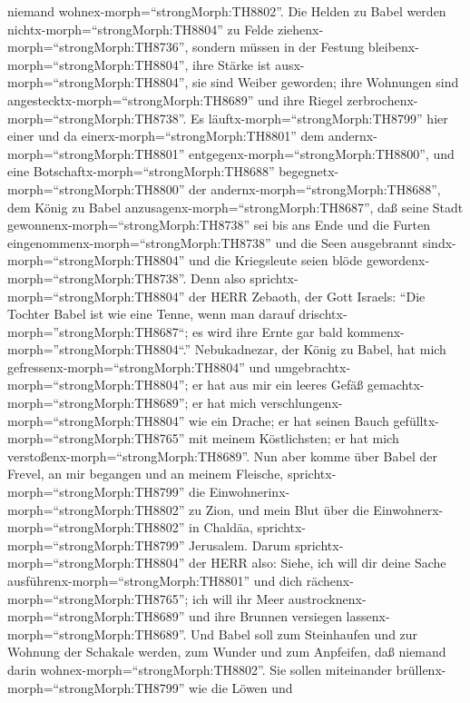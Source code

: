niemand wohnex-morph=``strongMorph:TH8802''.  Die Helden zu
Babel werden nichtx-morph=``strongMorph:TH8804'' zu Felde
ziehenx-morph=``strongMorph:TH8736'', sondern müssen in der Festung
bleibenx-morph=``strongMorph:TH8804'', ihre Stärke ist
ausx-morph=``strongMorph:TH8804'', sie sind Weiber geworden; ihre
Wohnungen sind angestecktx-morph=``strongMorph:TH8689'' und ihre Riegel
zerbrochenx-morph=``strongMorph:TH8738''.  Es
läuftx-morph=``strongMorph:TH8799'' hier einer und da
einerx-morph=``strongMorph:TH8801'' dem
andernx-morph=``strongMorph:TH8801''
entgegenx-morph=``strongMorph:TH8800'', und eine
Botschaftx-morph=``strongMorph:TH8688''
begegnetx-morph=``strongMorph:TH8800'' der
andernx-morph=``strongMorph:TH8688'', dem König zu Babel
anzusagenx-morph=``strongMorph:TH8687'', daß seine Stadt
gewonnenx-morph=``strongMorph:TH8738'' sei bis ans Ende 
und die Furten eingenommenx-morph=``strongMorph:TH8738'' und die Seen
ausgebrannt sindx-morph=``strongMorph:TH8804'' und die Kriegsleute seien
blöde gewordenx-morph=``strongMorph:TH8738''.  Denn also
sprichtx-morph=``strongMorph:TH8804'' der HERR Zebaoth, der Gott
Israels: ``Die Tochter Babel ist wie eine Tenne, wenn man darauf
drischtx-morph=''strongMorph:TH8687``; es wird ihre Ernte gar bald
kommenx-morph=''strongMorph:TH8804``.''  Nebukadnezar, der
König zu Babel, hat mich gefressenx-morph=``strongMorph:TH8804'' und
umgebrachtx-morph=``strongMorph:TH8804''; er hat aus mir ein leeres
Gefäß gemachtx-morph=``strongMorph:TH8689''; er hat mich
verschlungenx-morph=``strongMorph:TH8804'' wie ein Drache; er hat seinen
Bauch gefülltx-morph=``strongMorph:TH8765'' mit meinem Köstlichsten; er
hat mich verstoßenx-morph=``strongMorph:TH8689''.  Nun aber
komme über Babel der Frevel, an mir begangen und an meinem Fleische,
sprichtx-morph=``strongMorph:TH8799'' die
Einwohnerinx-morph=``strongMorph:TH8802'' zu Zion, und mein Blut über
die Einwohnerx-morph=``strongMorph:TH8802'' in Chaldäa,
sprichtx-morph=``strongMorph:TH8799'' Jerusalem.  Darum
sprichtx-morph=``strongMorph:TH8804'' der HERR also: Siehe, ich will dir
deine Sache ausführenx-morph=``strongMorph:TH8801'' und dich
rächenx-morph=``strongMorph:TH8765''; ich will ihr Meer
austrocknenx-morph=``strongMorph:TH8689'' und ihre Brunnen versiegen
lassenx-morph=``strongMorph:TH8689''.  Und Babel soll zum
Steinhaufen und zur Wohnung der Schakale werden, zum Wunder und zum
Anpfeifen, daß niemand darin wohnex-morph=``strongMorph:TH8802''.
 Sie sollen miteinander
brüllenx-morph=``strongMorph:TH8799'' wie die Löwen und

